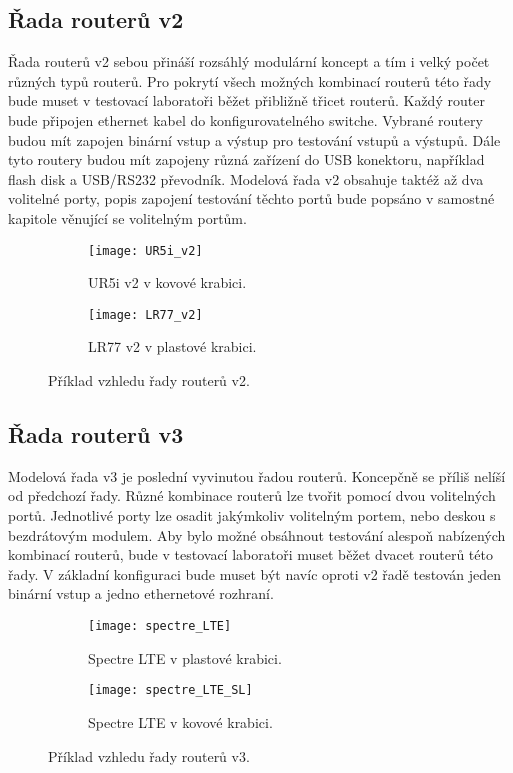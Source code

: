 \subsection{Řada routerů v2}
Řada routerů v2 sebou přináší rozsáhlý modulární koncept a tím i velký počet různých typů routerů. Pro pokrytí všech možných kombinací routerů této řady bude muset v testovací laboratoři běžet přibližně třicet routerů. Každý router bude připojen ethernet kabel do konfigurovatelného switche. Vybrané routery budou mít zapojen binární vstup a výstup pro testování vstupů a výstupů. Dále tyto routery budou mít zapojeny různá zařízení do USB konektoru, například flash disk a USB/RS232 převodník. Modelová řada v2 obsahuje taktéž až dva volitelné porty, popis zapojení testování těchto portů bude popsáno v samostné kapitole věnující se volitelným portům.

\begin{figure}[h]
  \begin{subfigure}[h]{0.5\LW}
    \centering
    \texttt{[image: UR5i\_v2]}
    \caption{UR5i v2 v kovové krabici.}
    \label{fig:UR5i_v2}
  \end{subfigure}
  \begin{subfigure}[h]{0.5\LW}
    \centering
    \texttt{[image: LR77\_v2]}
    \caption{LR77 v2 v plastové krabici.}
    \label{fig:LR77_v2}
  \end{subfigure}
  \caption{Příklad vzhledu řady routerů v2.}
  \label{fig:UR5i_v2}
\end{figure}

\subsection{Řada routerů v3}
Modelová řada v3 je poslední vyvinutou řadou routerů. Koncepčně se příliš nelíší od předchozí řady. Různé kombinace routerů lze tvořit pomocí dvou volitelných portů. Jednotlivé porty lze osadit jakýmkoliv volitelným portem, nebo deskou s bezdrátovým modulem. Aby bylo možné obsáhnout testování alespoň nabízených kombinací routerů, bude v testovací laboratoři muset běžet dvacet routerů této řady. V základní konfiguraci bude muset být navíc oproti v2 řadě testován jeden binární vstup a jedno ethernetové rozhraní.

\begin{figure}[h]
  \begin{subfigure}[h]{0.5\LW}
    \centering
    \texttt{[image: spectre\_LTE]}
    \caption{Spectre LTE v plastové krabici.}
    \label{fig:spectre_LTE}
  \end{subfigure}
  \begin{subfigure}[h]{0.5\LW}
    \centering
    \texttt{[image: spectre\_LTE\_SL]}
    \caption{Spectre LTE v kovové krabici.}
    \label{fig:spectre_LTE_SL}
  \end{subfigure}
  \caption{Příklad vzhledu řady routerů v3.}
  \label{fig:spectre_LTE}
\end{figure}

